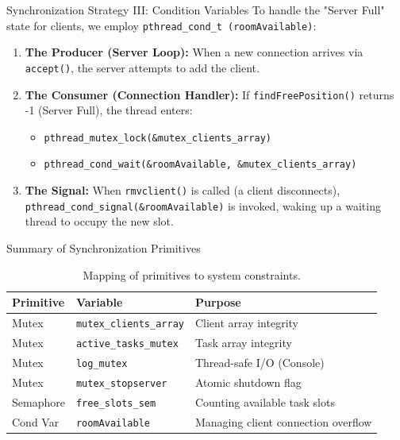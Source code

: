 \begin{frame}{Synchronization Strategy III: Condition Variables}
    To handle the "Server Full" state for clients, we employ \texttt{pthread\_cond\_t (\texttt{roomAvailable})}:
    \begin{enumerate}
        \item \textbf{The Producer (Server Loop):} When a new connection arrives via \texttt{accept()}, the server attempts to add the client.
        \item \textbf{The Consumer (Connection Handler):} If \texttt{findFreePosition()} returns -1 (Server Full), the thread enters:
        \begin{itemize}
            \item \texttt{pthread_mutex\_lock(\&mutex\_clients\_array)}
            \item \texttt{pthread_cond\_wait(\&roomAvailable, \&mutex\_clients\_array)}
        \end{itemize}
        \item \textbf{The Signal:} When \texttt{rmvclient()} is called (a client disconnects), \texttt{pthread\_cond\_signal(\&roomAvailable)} is invoked, waking up a waiting thread to occupy the new slot.
    \end{enumerate}
\end{frame}

\begin{frame}{Summary of Synchronization Primitives}
    \begin{table}
        \centering
        \small
        \begin{tabular}{|l|l|l|}
        \hline
        \textbf{Primitive} & \textbf{Variable} & \textbf{Purpose} \\ \hline
        Mutex & \texttt{mutex\_clients\_array} & Client array integrity \\ \hline
        Mutex & \texttt{active\_tasks\_mutex} & Task array integrity \\ \hline
        Mutex & \texttt{log\_mutex} & Thread-safe I/O (Console) \\ \hline
        Mutex & \texttt{mutex\_stopserver} & Atomic shutdown flag \\ \hline
        Semaphore & \texttt{free\_slots\_sem} & Counting available task slots \\ \hline
        Cond Var & \texttt{roomAvailable} & Managing client connection overflow \\ \hline
        \end{tabular}
        \caption{Mapping of primitives to system constraints.}
    \end{table}
\end{frame}

